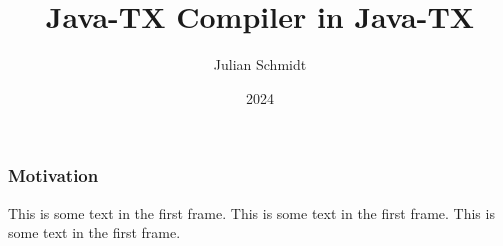 \documentclass{beamer}
\title{Java-TX Compiler in Java-TX}
\author{Julian Schmidt}
\institute{DHBW Stuttgart}
\date{2024}
\begin{document}
\maketitle

\begin{frame}
\frametitle{Motivation}
This is some text in the first frame. This is some text in the first frame. This is some text in the first frame.
\end{frame}
\end{document}
